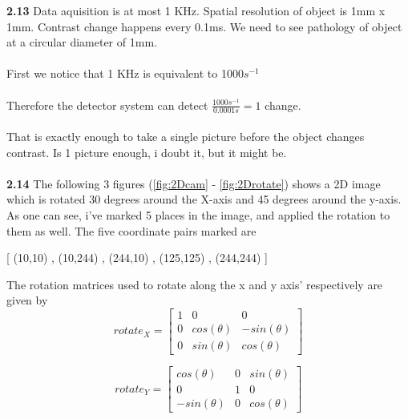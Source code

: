 \documentclass[]{article}
\begin{document}
\newpage
\vspace{0.5cm}
\textbf{2.13}
Data aquisition is at most 1 KHz. Spatial resolution of object is 1mm x 1mm. Contrast change happens every 0.1ms. We need to see pathology of object at a circular diameter of 1mm.\\\\
First we notice that 1 KHz is equivalent to 1000$s^{-1}$\\\\
Therefore the detector system can detect $\frac{1000s^{-1}}{0.0001s} = 1$ change.\\\\
That is exactly enough to take a single picture before the object changes contrast. Is 1 picture enough, i doubt it, but it might be.\\\\
\textbf{2.14} The following 3 figures (\ref{fig:2Dcam} - \ref{fig:2Drotate}) shows a 2D image which is rotated 30 degrees around the X-axis and 45 degrees around the y-axis. As one can see, i've marked 5 places in the image, and applied the rotation to them as well. The five coordinate pairs marked are\\
\begin{center}
[ (10,10) , (10,244) , (244,10) , (125,125) , (244,244) ]
\end{center}
\vspace{0.5cm}
The rotation matrices used to rotate along the x and y axis' respectively are given by
\begin{equation}
rotate_X =
  \begin{bmatrix}
    1 & 0 & 0 \\
    0 & cos(\theta) & -sin(\theta)\\
  	0 & sin(\theta) & cos(\theta)
  \end{bmatrix}
\end{equation}

\begin{equation}
rotate_Y =
  \begin{bmatrix}
    cos(\theta) & 0 & sin(\theta) \\
    0 & 1 & 0\\
  	-sin(\theta) & 0 & cos(\theta)
  \end{bmatrix}
\end{equation}
\end{document}
